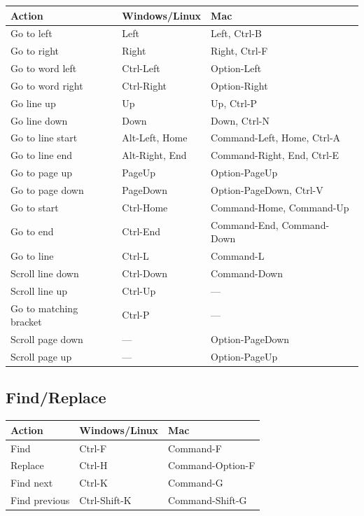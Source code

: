 \documentclass[
]{book}
\begin{document}
\begin{longtable}[]{@{}lll@{}}
\toprule
Action & Windows/Linux & Mac \\
\midrule
\endhead
Go to left & Left & Left, Ctrl-B \\
Go to right & Right & Right, Ctrl-F \\
Go to word left & Ctrl-Left & Option-Left \\
Go to word right & Ctrl-Right & Option-Right \\
Go line up & Up & Up, Ctrl-P \\
Go line down & Down & Down, Ctrl-N \\
Go to line start & Alt-Left, Home & Command-Left, Home, Ctrl-A \\
Go to line end & Alt-Right, End & Command-Right, End, Ctrl-E \\
Go to page up & PageUp & Option-PageUp \\
Go to page down & PageDown & Option-PageDown, Ctrl-V \\
Go to start & Ctrl-Home & Command-Home, Command-Up \\
Go to end & Ctrl-End & Command-End, Command-Down \\
Go to line & Ctrl-L & Command-L \\
Scroll line down & Ctrl-Down & Command-Down \\
Scroll line up & Ctrl-Up & --- \\
Go to matching bracket & Ctrl-P & --- \\
Scroll page down & --- & Option-PageDown \\
Scroll page up & --- & Option-PageUp \\
\bottomrule
\end{longtable}

\hypertarget{findreplace}{%
\subsection{Find/Replace}\label{findreplace}}

\begin{longtable}[]{@{}lll@{}}
\toprule
Action & Windows/Linux & Mac \\
\midrule
\endhead
Find & Ctrl-F & Command-F \\
Replace & Ctrl-H & Command-Option-F \\
Find next & Ctrl-K & Command-G \\
Find previous & Ctrl-Shift-K & Command-Shift-G \\
\bottomrule
\end{longtable}
\end{document}
